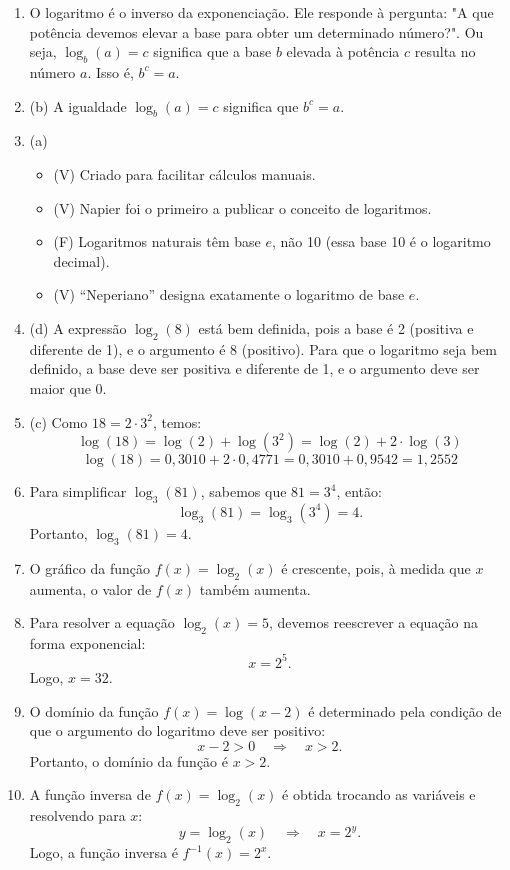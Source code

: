 \documentclass[12pt,a4paper]{article}
\begin{document}
\begin{enumerate}
  \item O logaritmo é o inverso da exponenciação. Ele responde à pergunta: "A que potência devemos elevar a base para obter um determinado número?". Ou seja, $\log_b(a) = c$ significa que a base $b$ elevada à potência $c$ resulta no número $a$. Isso é, $b^c = a$.

  \item (b) A igualdade $\log_b(a) = c$ significa que $b^c = a$.

  \item (a)
        \begin{itemize}
          \item (V) Criado para facilitar cálculos manuais.
          \item (V) Napier foi o primeiro a publicar o conceito de logaritmos.
          \item (F) Logaritmos naturais têm base \(e\), não 10 (essa base 10 é o logaritmo decimal).
          \item (V) “Neperiano” designa exatamente o logaritmo de base \(e\).
        \end{itemize}


  \item (d) A expressão $\log_2(8)$ está bem definida, pois a base é 2 (positiva e diferente de 1), e o argumento é 8 (positivo).
        Para que o logaritmo seja bem definido, a base deve ser positiva e diferente de 1, e o argumento deve ser maior que 0.

  \item (c) Como $18 = 2 \cdot 3^2$, temos:
        \[
          \log(18) = \log(2) + \log(3^2) = \log(2) + 2 \cdot \log(3)
        \]
        \[
          \log(18) = 0{,}3010 + 2 \cdot 0{,}4771 = 0{,}3010 + 0{,}9542 = 1{,}2552
        \]

  \item Para simplificar $\log_3(81)$, sabemos que $81 = 3^4$, então:
        \[
          \log_3(81) = \log_3(3^4) = 4.
        \]
        Portanto, $\log_3(81) = 4$.

  \item O gráfico da função $f(x) = \log_2(x)$ é crescente, pois, à medida que $x$ aumenta, o valor de $f(x)$ também aumenta.

  \item Para resolver a equação $\log_2(x) = 5$, devemos reescrever a equação na forma exponencial:
        \[
          x = 2^5.
        \]
        Logo, $x = 32$.

  \item O domínio da função $f(x) = \log(x - 2)$ é determinado pela condição de que o argumento do logaritmo deve ser positivo:
        \[
          x - 2 > 0 \quad \Rightarrow \quad x > 2.
        \]
        Portanto, o domínio da função é $x > 2$.

  \item A função inversa de $f(x) = \log_2(x)$ é obtida trocando as variáveis e resolvendo para $x$:
        \[
          y = \log_2(x) \quad \Rightarrow \quad x = 2^y.
        \]
        Logo, a função inversa é $f^{-1}(x) = 2^x$.
\end{enumerate}
\end{document}

